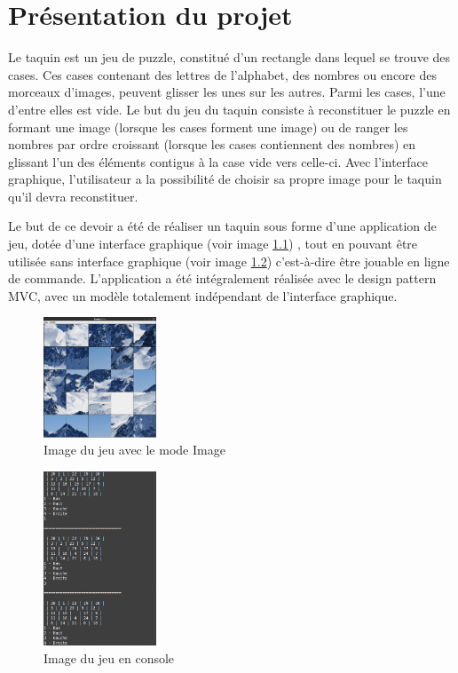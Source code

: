 \chapter{Présentation du projet}

		Le taquin est un jeu de puzzle, constitué d’un rectangle dans lequel se trouve des cases. Ces cases contenant des lettres de l'alphabet, des nombres ou encore des morceaux d’images, peuvent glisser les unes sur les autres. Parmi les cases, l’une d'entre elles est vide.
		Le but du jeu du taquin consiste à reconstituer le puzzle en formant une image (lorsque les cases forment une image) ou de ranger les nombres par ordre croissant (lorsque les cases contiennent des nombres) en glissant l'un des éléments contigus à la case vide vers celle-ci. Avec l’interface graphique, l'utilisateur a la possibilité de choisir sa propre image pour le taquin qu’il devra reconstituer.

		Le but de ce devoir a été de réaliser un taquin sous forme d’une application de jeu, dotée d'une interface graphique (voir image \ref{fig:JeuImage}) , tout en pouvant être utilisée sans interface graphique (voir image \ref{fig:JeuConsole}) c'est-à-dire être jouable en ligne de commande. L'application a été intégralement réalisée avec le design pattern MVC, avec un modèle totalement indépendant de l'interface graphique.

		\begin{figure}[H]
			\centering\includegraphics[width=0.30\textwidth, keepaspectratio]{img/jeuImage.png}
			\caption{Image du jeu avec le mode Image}
			\label{fig:JeuImage}
		\end{figure}

		\begin{figure}[H]
			\centering\includegraphics[width=0.30\textwidth, keepaspectratio]{img/jeuConsole.png}
			\caption{Image du jeu en console}
			\label{fig:JeuConsole}
		\end{figure}
